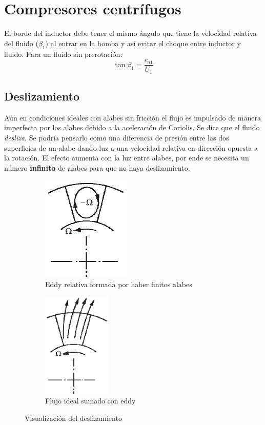 \documentclass{article}
\newcommand{\cax}[1]{\ensuremath{c_{a #1}}}
\begin{document}
\section{Compresores centrífugos}


El borde del inductor debe tener el mismo ángulo que tiene la velocidad relativa del fluido ($\beta_1$) al entrar en la bomba y así evitar el choque entre inductor y fluido. Para un fluido sin prerotación:
\[
\tan \beta_1 = \frac{\cax{1}}{U_1}
\]

\subsection{Deslizamiento}
Aún en condiciones ideales con alabes sin fricción el flujo es impulsado de manera imperfecta por los alabes debido a la aceleración de Coriolis. Se dice que el fluido \textit{desliza}. Se podría pensarlo como una diferencia de presión entre las dos superficies de un alabe dando luz a una velocidad relativa en dirección opuesta a la rotación. El efecto aumenta con la luz entre alabes, por ende se necesita un número \textbf{infinito} de alabes para que no haya deslizamiento.

\begin{figure}[htb!]
\centering
\begin{subfigure}{.49\textwidth}
\centering
\includegraphics[height=5cm]{fig/eddydeslizamiento.png}
\caption{Eddy relativa formada por haber finitos alabes}
\label{fig:deslizamientoEddy}
\end{subfigure}%
\begin{subfigure}{.49\textwidth}
\centering
\includegraphics[height= 5cm]{fig/deslizamientoconeddy.png}
\caption{Flujo ideal sumado con eddy}
\label{fig:deslizamientoEddyMasFlujoIdeal}
\end{subfigure}
\caption{Visualización del deslizamiento}
\label{fig:explicaciondeslizamiento}
\end{figure}
\end{document}
